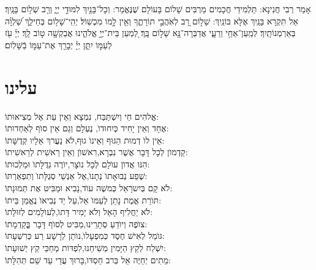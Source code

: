 \documentclass[twoside, openany, parskip=half, 11pt]{book}
\begin{document}
\sepline

  אָמַר רְבִי חֲנִינָא: תַּלְמִידֵי חֲכָמִים מַרְבִּים שָׁלוֹם בָּעוֹלָם שֶׁנֶּאֱמַר: 
  וְכָל־בָּנַ֖יִךְ לִמּוּדֵ֣י יְיָ֑ וְרַ֖ב שְׁל֥וֹם בָּנָֽיִךְ׃ אַל תִּקְרָא בָּנַֽיִךְ אֶלָּא בּוֹנַֽיִךְ: 
  שָׁל֣וֹם רָ֭ב לְאֹֽהֲבֵ֣י תוֹרָתֶ֑ךָ וְאֵ֖ין לָ֣מוֹ מִכְשֽׁוֹל׃ יְהִֽי־שָׁל֥וֹם
   בְּחֵילֵ֑ךְ שַׁ֝לְוָ֗ה בְּאַרְמְנוֹתָֽיִךְ׃  לְמַֽעַן־אַחַ֥י וְרֵעָ֑י אֲדַבְּרָה־נָּ֖א שָׁל֣וֹם בָּֽךְ׃ לְ֭מַעַן בֵּית־יְיָ֣ אֱלֹהֵ֑ינוּ אֲבַקְשָׁ֖ה ט֣וֹב לָֽךְ׃
    יְיָ֗ עֹ֖ז לְעַמּ֣וֹ יִתֵּ֑ן יְיָ֓   יְבָרֵ֖ךְ אֶת־עַמּ֣וֹ בַֿשָּׁלֽוֹם׃


\mournerskaddish

\section*{ עלינו }
\aleinu





 אֱלהִים חַי וְיִשְׁתַּבַּח, \hfill נִמְצָא וְאֵין עֵת אֶל מְצִיאוּתוֹ: \\
אֶחָד וְאֵין יָחִיד כְּיִחוּדוׂ, \hfill נֶעְלָם וְגַם אֵין סוׂף לְאַחְדוּתוֹ: \\
 אֵין לוׂ דְמוּת הַגּוּף וְאֵינוׂ גוּף,\hfill לׂא נַעֲרךְ אֵלָיו קְדֻשָּׁתוֹ: \\
 קַדְמוׂן לְכָל דָּבָר אֲשֶׁר נִבְרָא,\hfill רִאשׁוׂן וְאֵין רֵאשִׁית לְרֵאשִׁיתוֹ: \\
 הִנּו אֲדוׂן עוׂלָם לְכָל נוׂצָר,\hfill יוׂרֶה גְדֻלָּתוׂ וּמַלְכוּתוֹ: \\
 שֶׁפַע נְבוּאָתוׂ נְתָנוׂ,\hfill אֶל אַנְשֵׁי סְגֻלָּתוׂ וְתִפְאַרְתּוֹ: \\
 לׂא קָם בְּיִשרָאֵל כְּמשֶׁה עוׂד,\hfill נָבִיא וּמַבִּיט אֶת תְּמוּנָתוֹ: \\
 תּוׂרַת אֱמֶת נָתַן לְעַמּוׂ אֵל,\hfill עַל יַד נְבִיאוׂ נֶאֱמַן בֵּיתוֹ: \\
 לׂא יַחֲלִיף הָאֵל וְלׂא יָמִיר דָּתוׂ,\hfill לְעוׂלָמִים לְזוּלָתוֹ: \\
 צוׂפֶה וְיוׂדֵעַ סְתָרֵינוּ,\hfill מַבִּיט לְסוׂף דָּבָר בְְַּקַדְמָתוֹ: \\
 גּוׂמֵל לְאִישׁ חֶסֶד כְּמִפְעָלוׂ,\hfill נוׂתֵן לְרָשָׁע רַע כְּרִשְׁעָתוֹ: \\
 יִשְׁלַח לְקֵץ הַיָּמִין מְשִׁיחֵנוּ,\hfill לִפְדּות מְחַכֵּי קֵץ יְשׁוּעָתוֹ: \\
 מֵתִים יְחַיֶּה אֵל בְּרב חַסְדּוׂ,\hfill בָּרוּךְ עֲדֵי עַד שֵׁם תְּהִלָּתוֹ:\\
\end{document}

